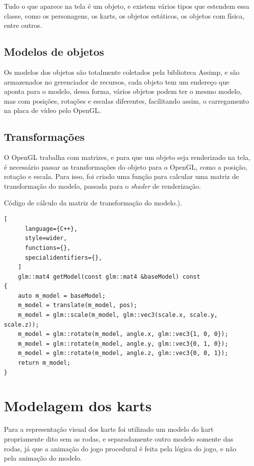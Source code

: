 Tudo o que aparece na tela é um objeto, e existem vários tipos que estendem essa classe, como os personagens, os karts, os objetos estáticos, os objetos com física, entre outros.

\subsection{Modelos de objetos}

Os modelos dos objetos são totalmente coletados pela biblioteca Assimp, e são armazenados no gerenciador de recursos, cada objeto tem um endereço que aponta para o modelo, dessa forma, vários objetos podem ter o mesmo modelo, mas com posições, rotações e escalas diferentes, facilitando assim, o carregamento na placa de vídeo pelo OpenGL.
\subsection{Transformações}

O OpenGL trabalha com matrizes, e para que um objeto seja renderizado na tela, é necessário passar as transformações do objeto para o OpenGL, como a posição, rotação e escala. Para isso, foi criado uma função para calcular uma matriz de transformação do modelo, passada para o \textit{shader} de renderização.

\begin{programruledcaption}{Código de cálculo da matriz de transformação do modelo.).\label{prog:model}}
    \begin{lstlisting}[
      language={C++},
      style=wider,
      functions={},
      specialidentifiers={},
    ]
    glm::mat4 getModel(const glm::mat4 &baseModel) const
{
    auto m_model = baseModel;
    m_model = translate(m_model, pos);
    m_model = glm::scale(m_model, glm::vec3(scale.x, scale.y, scale.z));
    m_model = glm::rotate(m_model, angle.x, glm::vec3{1, 0, 0});
    m_model = glm::rotate(m_model, angle.y, glm::vec3{0, 1, 0});
    m_model = glm::rotate(m_model, angle.z, glm::vec3{0, 0, 1});
    return m_model;
}
    \end{lstlisting}
\end{programruledcaption}

\section{Modelagem dos karts}

Para a representação visual dos karts foi utilizado um modelo do kart propriamente dito sem as rodas, e separadamente outro modelo somente das rodas, já que a animação do jogo procedural é feita pela lógica do jogo, e não pela animação do modelo.


